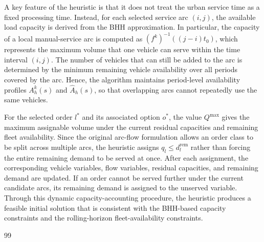 \documentclass[10pt, reqno]{amsart}
\begin{document}
A key feature of the heuristic is that it does not treat the urban service time as a fixed processing time. Instead, for each selected service arc $(i,j)$, the available load capacity is derived from the BHH approximation. In particular, the capacity of a local manual-service arc is computed as $(f^k)^{-1}((j-i)t_0)$, which represents the maximum volume that one vehicle can serve within the time interval $(i,j)$. The number of vehicles that can still be added to the arc is determined by the minimum remaining vehicle availability over all periods covered by the arc. Hence, the algorithm maintains period-level availability profiles $A_h^k(s)$ and $\widehat A_h(s)$, so that overlapping arcs cannot repeatedly use the same vehicles.

For the selected order $l^*$ and its associated option $o^*$, the value $Q^{\max}$ gives the maximum assignable volume under the current residual capacities and remaining fleet availability. Since the original arc-flow formulation allows an order class to be split across multiple arcs, the heuristic assigns $q_l\le d_l^{\mathrm{rem}}$ rather than forcing the entire remaining demand to be served at once. After each assignment, the corresponding vehicle variables, flow variables, residual capacities, and remaining demand are updated. If an order cannot be served further under the current candidate arcs, its remaining demand is assigned to the unserved variable. Through this dynamic capacity-accounting procedure, the heuristic produces a feasible initial solution that is consistent with the BHH-based capacity constraints and the rolling-horizon fleet-availability constraints.

\begin{thebibliography}{99}

\printbibliography

\end{thebibliography}
\end{document}
